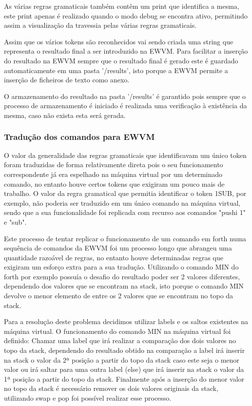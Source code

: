 \documentclass{article}
\begin{document}
As várias regras gramaticais também contêm um print que identifica a mesma, este print apenas é realizado quando o modo debug se encontra ativo, permitindo assim a visualização da travessia pelas várias regras gramaticais.

Assim que os vários tokens são reconhecidos vai sendo criada uma string que representa o resultado final a ser introduzido na EWVM. 
Para facilitar a inserção do resultado na EWVM sempre que o resultado final é gerado este é guardado automaticamente em uma pasta '/results', isto porque a EWVM permite a inserção de ficheiros de texto como anexo.

O armazenamento do resultado na pasta '/results' é garantido pois sempre que o processo de armazenamento é iniciado é realizada uma verificação à existência da mesma, caso não exista esta será gerada.







\subsubsection{Tradução dos comandos para EWVM}
O valor da generalidade das regras gramaticais que identificavam um único token foram traduzidas de forma relativamente direta pois o seu funcionamento correspondente já era espelhado na máquina virtual por um determinado comando, no entanto houve certos tokens que exigiram um pouco mais de trabalho. O valor da regra gramatical que permitia identificar o token 1SUB, por exemplo, não poderia ser traduzido em um único comando na máquina virtual, sendo que a sua funcionalidade foi replicada com recurso aos comandos "pushi 1" e "sub". 

Este processo de tentar replicar o funcionamento de um comando em forth numa sequência de comandos da EWVM foi um processo longo que abrangeu uma quantidade razoável de regras, no entanto houve determinadas regras que exigiram um esforço extra para a sua tradução. Utilizando o comando MIN do forth por exemplo possuía o desafio do resultado poder ser 2 valores diferentes, dependendo dos valores que se encontram na stack, isto porque o comando MIN devolve o menor elemento de entre os 2 valores que se encontram no topo da stack.

Para a resolução deste problema decidimos utilizar labels e os saltos existentes na máquina virtual. O funcionamento do comando MIN na máquina virtual foi definido: Chamar uma label que irá realizar a comparação dos dois valores no topo da stack, dependendo do resultado obtido na comparação a label irá inserir na stack o valor da 2ª posição a partir do topo da stack caso este seja o menor valor ou irá saltar para uma outra label (else) que irá inserir na stack o valor da 1ª posição a partir do topo da stack. Finalmente após a inserção do menor valor no topo da stack é necessário remover os dois valores originais da stack, utilizando swap e pop foi possível realizar esse processo.
\end{document}
